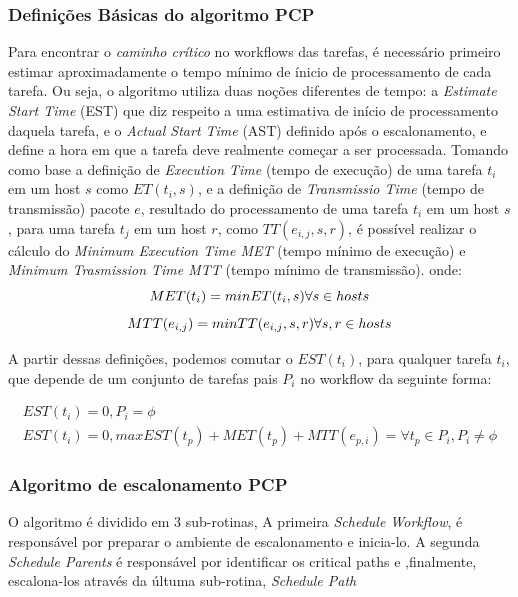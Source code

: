 \documentclass[a4paper,10pt]{article}
\begin{document}
\subsubsection{Definições Básicas do algoritmo PCP}
Para encontrar o \emph{caminho crítico} no workflows das tarefas, é necessário primeiro estimar aproximadamente o tempo mínimo de ínicio de processamento de cada tarefa. Ou seja, o algoritmo utiliza duas noções diferentes de tempo: a \emph{Estimate Start Time} (EST) que diz respeito a uma estimativa de início de processamento daquela tarefa, e o \emph{Actual Start Time} (AST) definido após o escalonamento, e define a hora em que a tarefa deve realmente começar a ser processada.
Tomando como base a definição de \emph{Execution Time} (tempo de execução) de uma tarefa $t_{i}$ em um host $s$ como $ET(t_{i},s)$, e a definição de \emph{Transmissio Time} (tempo de transmissão) pacote $e$, resultado do processamento de uma tarefa $t_{i}$ em um host $s$, para uma tarefa $t_{j}$ em um host $r$, como $TT(e_{i,j},s,r)$, é possível realizar o cálculo do \emph{Minimum Execution Time MET} (tempo mínimo de execução) e \emph{Minimum Trasmission Time MTT} (tempo mínimo de transmissão). onde:
\begin{equation}
MET(t_{i}) = min ET(t_{i},s) \\ \forall s \in hosts
\end{equation}
\begin{equation}
MTT(e_{i,j}) = min TT(e_{i,j},s,r) \\ \forall s,r \in hosts
\end{equation}

A partir dessas definições, podemos comutar o $EST(t_{i})$, para qualquer tarefa $t_{i}$, que depende de um conjunto de tarefas pais $P_{i}$ no workflow da seguinte forma:

\begin{eqnarray}
EST(t_{i}) = 0, P_{i} = \phi \nonumber\\
EST(t_{i}) = 0, max EST(t_{p})+MET(t_{p})+MTT(e_{p,i}) = \forall t_{p} \in P_{i}, P_{i} \neq \phi
\end{eqnarray}

\subsubsection{Algoritmo de escalonamento PCP}
O algoritmo é dividido em 3 sub-rotinas, A primeira \emph{Schedule Workflow}, é responsável por preparar o ambiente de escalonamento e inicia-lo. A segunda \emph{Schedule Parents} é responsável por identificar os critical paths e ,finalmente, escalona-los através da últuma sub-rotina, \emph{Schedule Path}
\end{document}
